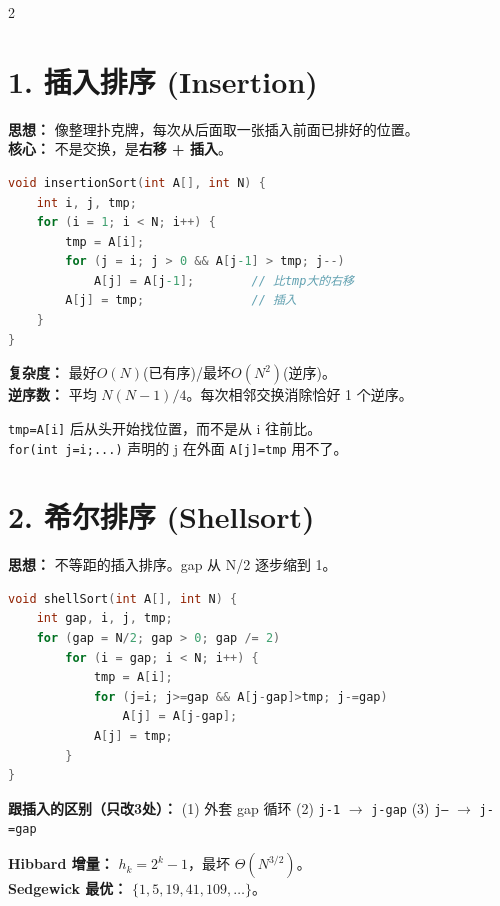 \documentclass[10pt,a4paper]{article}
\begin{document}
\begin{multicols}{2}

\section*{1. 插入排序 (Insertion)}

\textbf{思想：} 像整理扑克牌，每次从后面取一张插入前面已排好的位置。\\
\textbf{核心：} 不是交换，是\textbf{右移 + 插入}。

\begin{lstlisting}[language=C]
void insertionSort(int A[], int N) {
    int i, j, tmp;
    for (i = 1; i < N; i++) {
        tmp = A[i];
        for (j = i; j > 0 && A[j-1] > tmp; j--)
            A[j] = A[j-1];        // 比tmp大的右移
        A[j] = tmp;               // 插入
    }
}
\end{lstlisting}

\textbf{复杂度：} 最好$O(N)$(已有序)/最坏$O(N^2)$(逆序)。\\
\textbf{逆序数：} 平均 $N(N-1)/4$。每次相邻交换消除恰好 1 个逆序。

\begin{bugbox}
\texttt{tmp=A[i]} 后从头开始找位置，而不是从 i 往前比。\\
\texttt{for(int j=i;...)}  声明的 j 在外面 \texttt{A[j]=tmp} 用不了。
\end{bugbox}

\section*{2. 希尔排序 (Shellsort)}

\textbf{思想：} 不等距的插入排序。gap 从 N/2 逐步缩到 1。

\begin{lstlisting}[language=C]
void shellSort(int A[], int N) {
    int gap, i, j, tmp;
    for (gap = N/2; gap > 0; gap /= 2)
        for (i = gap; i < N; i++) {
            tmp = A[i];
            for (j=i; j>=gap && A[j-gap]>tmp; j-=gap)
                A[j] = A[j-gap];
            A[j] = tmp;
        }
}
\end{lstlisting}

\textbf{跟插入的区别（只改3处）：}
(1) 外套 gap 循环 (2) \texttt{j-1} $\to$ \texttt{j-gap} (3) \texttt{j--} $\to$ \texttt{j-=gap}

\textbf{Hibbard 增量：} $h_k=2^k-1$，最坏 $\Theta(N^{3/2})$。\\
\textbf{Sedgewick 最优：} $\{1,5,19,41,109,\dots\}$。


\end{multicols}
\end{document}
